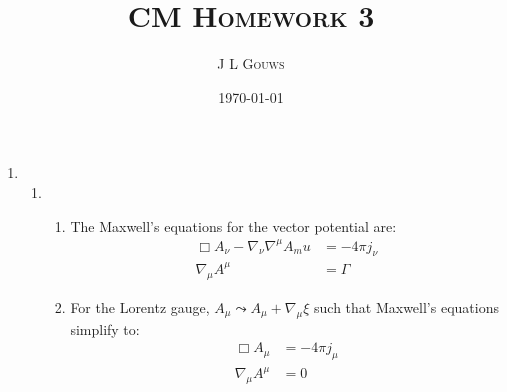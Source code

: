 \documentclass[12pt,a4]{article}
\title{
\textsc{CM Homework 3}
}
\author{\textsc{J L Gouws}
}
\date{\today
\\[1cm]}
\begin{document}
\thispagestyle{empty}

\maketitle

\begin{enumerate}
  \item
    \begin{enumerate}
      \item
        \begin{enumerate}
          \item
            The Maxwell's equations for the vector potential are:
            \begin{align*}
              \Box A_\nu -\nabla_\nu\nabla^\mu A_mu &= - 4 \pi j_\nu\\
              \nabla_\mu A^\mu &= \Gamma
            \end{align*}
          \item 
            For the Lorentz gauge, $A_\mu \leadsto A_\mu + \nabla_\mu \xi$ such that Maxwell's equations simplify to:
            \begin{align*}
              \Box A_\mu &= -4 \pi j_\mu\\
              \nabla_\mu A^\mu &= 0
            \end{align*}
        \end{enumerate}


\end{enumerate}
\end{enumerate}
\end{document}
